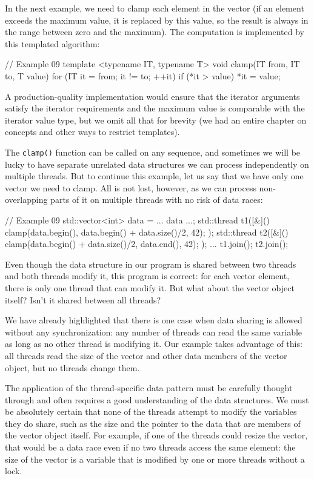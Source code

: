 In the next example, we need to clamp each element in the vector (if an element exceeds the maximum value, it is replaced by this value, so the result is always in the range between zero and the maximum). The computation is implemented by this templated algorithm:

\begin{code}
// Example 09
template <typename IT, typename T>
void clamp(IT from, IT to, T value) {
  for (IT it = from; it != to; ++it) {
    if (*it > value) *it = value;
  }
}
\end{code}

A production-quality implementation would ensure that the iterator arguments satisfy the iterator requirements and the maximum value is comparable with the iterator value type, but we omit all that for brevity (we had an entire chapter on concepts and other ways to restrict templates).

The \texttt{clamp()} function can be called on any sequence, and sometimes we will be lucky to have separate unrelated data structures we can process independently on multiple threads. But to continue this example, let us say that we have only one vector we need to clamp. All is not lost, however, as we can process non-overlapping parts of it on multiple threads with no risk of data races:

\begin{code}
// Example 09
std::vector<int> data = ... data ...;
std::thread t1([&](){
  clamp(data.begin(), data.begin() + data.size()/2, 42);
});
std::thread t2([&](){
  clamp(data.begin() + data.size()/2, data.end(), 42);
});
...
t1.join();
t2.join();
\end{code}

Even though the data structure in our program is shared between two threads and both threads modify it, this program is correct: for each vector element, there is only one thread that can modify it. But what about the vector object itself? Isn't it shared between all threads?

We have already highlighted that there is one case when data sharing is allowed without any synchronization: any number of threads can read the same variable as long as no other thread is modifying it. Our example takes advantage of this: all threads read the size of the vector and other data members of the vector object, but no threads change them.

The application of the thread-specific data pattern must be carefully thought through and often requires a good understanding of the data structures. We must be absolutely certain that none of the threads attempt to modify the variables they do share, such as the size and the pointer to the data that are members of the vector object itself. For example, if one of the threads could resize the vector, that would be a data race even if no two threads access the same element: the size of the vector is a variable that is modified by one or more threads without a lock.

